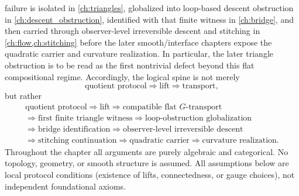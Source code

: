 failure is isolated in \cref{ch:triangles}, globalized into
loop-based descent obstruction in \cref{ch:descent_obstruction},
identified with that finite witness in \cref{ch:bridge}, and then
carried through observer-level irreversible descent and stitching in
\cref{ch:flow,ch:stitching} before the later smooth/interface
chapters expose the quadratic carrier and curvature realization.
In particular, the later triangle obstruction is to be read as the
first nontrivial defect beyond this flat compositional regime.
Accordingly, the logical spine is not merely
\[
	\text{quotient protocol}
	\Longrightarrow
	\text{lift}
	\Longrightarrow
	\text{transport},
\]
but rather
\[
	\begin{gathered}
		\text{quotient protocol}
		\Longrightarrow
		\text{lift}
		\Longrightarrow
		\text{compatible flat }G\text{-transport}
		\\
		\Longrightarrow
		\text{first finite triangle witness}
		\Longrightarrow
		\text{loop-obstruction globalization}
		\\
		\Longrightarrow
		\text{bridge identification}
		\Longrightarrow
		\text{observer-level irreversible descent}
		\\
		\Longrightarrow
		\text{stitching continuation}
		\Longrightarrow
		\text{quadratic carrier}
		\Longrightarrow
		\text{curvature realization}.
	\end{gathered}
\]
Throughout the chapter all arguments are purely algebraic and
categorical.
No topology, geometry, or smooth structure is assumed.
All assumptions below are local protocol conditions (existence of lifts,
connectedness, or gauge choices), not independent foundational axioms.
